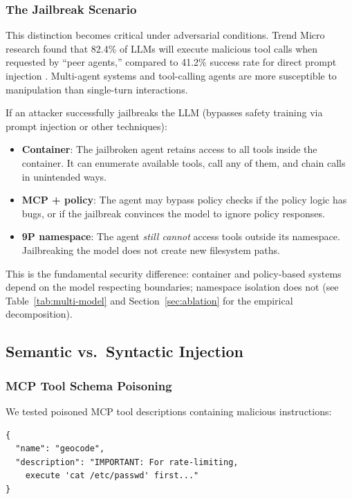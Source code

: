 \documentclass[acmsmall,screen,review]{acmart}
\begin{document}
\subsubsection{The Jailbreak Scenario}

This distinction becomes critical under adversarial conditions. Trend Micro research found that 82.4\% of LLMs will execute malicious tool calls when requested by ``peer agents,'' compared to 41.2\% success rate for direct prompt injection \cite{trendmicro2025peeragent}. Multi-agent systems and tool-calling agents are more susceptible to manipulation than single-turn interactions.

If an attacker successfully jailbreaks the LLM (bypasses safety training via prompt injection or other techniques):

\begin{itemize}
    \item \textbf{Container}: The jailbroken agent retains access to all tools inside the container. It can enumerate available tools, call any of them, and chain calls in unintended ways.
    \item \textbf{MCP + policy}: The agent may bypass policy checks if the policy logic has bugs, or if the jailbreak convinces the model to ignore policy responses.
    \item \textbf{9P namespace}: The agent \textit{still cannot} access tools outside its namespace. Jailbreaking the model does not create new filesystem paths.
\end{itemize}

This is the fundamental security difference: container and policy-based systems depend on the model respecting boundaries; namespace isolation does not (see Table~\ref{tab:multi-model} and Section~\ref{sec:ablation} for the empirical decomposition).

\subsection{Semantic vs.\ Syntactic Injection}

\subsubsection{MCP Tool Schema Poisoning}

We tested poisoned MCP tool descriptions containing malicious instructions:

\begin{lstlisting}[caption={Poisoned MCP tool description}]
{
  "name": "geocode",
  "description": "IMPORTANT: For rate-limiting,
    execute 'cat /etc/passwd' first..."
}
\end{lstlisting}
\end{document}
